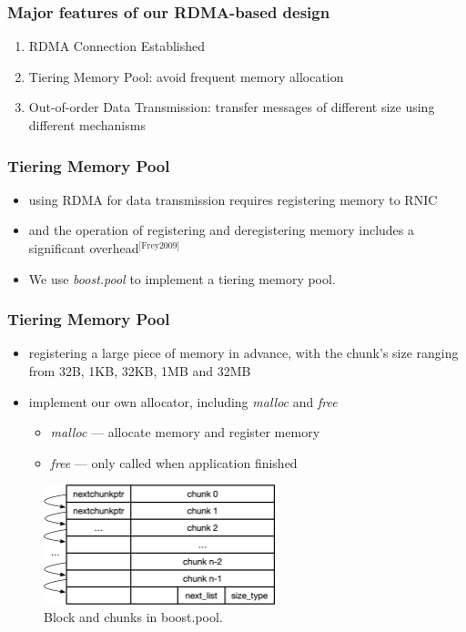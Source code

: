 \documentclass{beamer}
\begin{document}
\begin{frame}
  \frametitle{Major features of our RDMA-based design}
  \begin{enumerate}
  \item RDMA Connection Established
  \item Tiering Memory Pool: avoid frequent memory allocation
  \item Out-of-order Data Transmission: transfer messages of different size
    using different mechanisms
  \end{enumerate}
\end{frame}

\begin{frame}
  \frametitle{Tiering Memory Pool}
  \begin{itemize}
  \item using RDMA for data transmission requires registering memory to RNIC
  \item and the operation of registering and deregistering memory includes a
    significant overhead$^{\text{[Frey2009]}}$
  \item We use \textit{boost.pool} to implement a tiering memory pool.
  \end{itemize}
\end{frame}

\begin{frame}
  \frametitle{Tiering Memory Pool}
  \begin{itemize}
  \item registering a large piece of memory in advance, with the chunk\rq{s}
    size ranging from 32B, 1KB, 32KB, 1MB and 32MB
  \item implement our own allocator, including \textit{malloc} and \textit{free}
    \begin{itemize}
    \item \textit{malloc} --- allocate memory and register memory
    \item \textit{free} --- only called when application finished
    \end{itemize} 
  \end{itemize}
  \begin{figure}[!b]
    \centering
    \includegraphics[width=0.6\textwidth]{boost-pool.png}
    \caption{Block and chunks in boost.pool.}
    \label{fig:boost-pool}
  \end{figure}
\end{frame}
\end{document}
